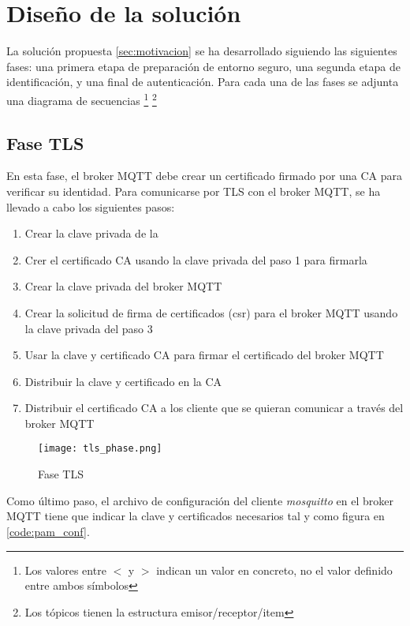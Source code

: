\cleardoublepage

\chapter{Diseño de la solución}

La solución propuesta \ref{sec:motivacion} se ha desarrollado siguiendo las siguientes fases: una primera etapa de preparación de
entorno seguro, una segunda etapa de identificación, y una final de autenticación. Para cada una de las fases se adjunta una 
diagrama de secuencias \footnote{Los valores entre $<$ y $>$ indican un valor en concreto, no el valor definido entre ambos 
símbolos} \footnote{Los tópicos tienen la estructura emisor/receptor/item}

\section{Fase TLS}
\label{sec:tls_phase}

En esta fase, el broker MQTT debe crear un certificado firmado por una CA para verificar su identidad. 
Para comunicarse por TLS con el broker MQTT, se ha llevado a cabo los siguientes pasos:

\begin{enumerate}
    \item Crear la clave privada de la 
    \item Crer el certificado CA usando la clave privada del paso 1 para firmarla
    \item Crear la clave privada del broker MQTT
    \item Crear la solicitud de firma de certificados (\acrshort{csr}) para el broker MQTT usando la clave privada del paso 3
    \item Usar la clave y certificado CA para firmar el certificado del broker MQTT
    \item Distribuir la clave y certificado en la CA
    \item Distribuir el certificado CA a los cliente que se quieran comunicar a través del broker MQTT 
\end{enumerate}

\begin{figure}[H]
    \centering
    \texttt{[image: tls\_phase.png]}
    \caption{Fase TLS}
\end{figure}

Como último paso, el archivo de configuración del cliente \textit{mosquitto} en el broker MQTT tiene que indicar la clave y 
certificados necesarios tal y como figura en \ref{code:pam_conf}.

